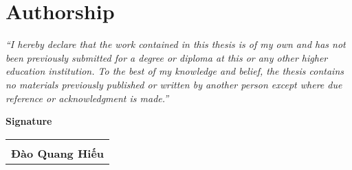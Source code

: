 \section*{Authorship}
\label{sec:authorship}

\emph{``I hereby declare that the work contained in this thesis is of my own and has not been previously submitted for a degree or diploma at this or any other higher education institution. To the best of my knowledge and belief, the thesis contains no materials previously published or written by another person except where due reference or acknowledgment is made.''} \\

\vspace{1cm}

\begin{center}
    \textbf{\large{Signature}}
    \vspace{2cm}

\begin{table}[h!]
\centering
\begin{tabularx}{0.45\linewidth}{ 
   >{\centering\arraybackslash}X 
}
\hrulefill                  \\
\textbf{Đào Quang Hiếu} 
\end{tabularx}
\end{table}
\end{center}